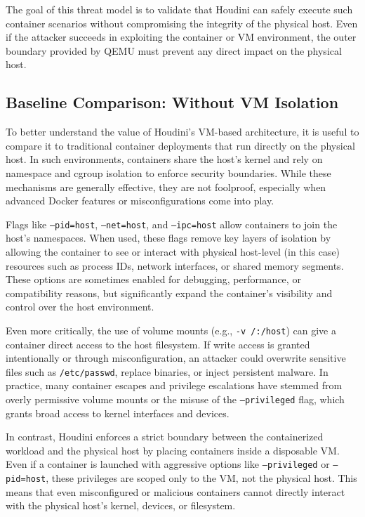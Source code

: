 \documentclass[12pt]{report}
\begin{document}
\begin{doublespace}
The goal of this threat model is to validate that Houdini can safely execute such container scenarios without compromising the integrity of the physical host. Even if the attacker succeeds in exploiting the container or VM environment, the outer boundary provided by QEMU must prevent any direct impact on the physical host.

\subsection{Baseline Comparison: Without VM Isolation}

To better understand the value of Houdini’s VM-based architecture, it is useful to compare it to traditional container deployments that run directly on the physical host. In such environments, containers share the host's kernel and rely on namespace and cgroup isolation to enforce security boundaries. While these mechanisms are generally effective, they are not foolproof, especially when advanced Docker features or misconfigurations come into play.

Flags like \texttt{--pid=host}, \texttt{--net=host}, and \texttt{--ipc=host} allow containers to join the host’s namespaces. When used, these flags remove key layers of isolation by allowing the container to see or interact with physical host-level (in this case) resources such as process IDs, network interfaces, or shared memory segments. These options are sometimes enabled for debugging, performance, or compatibility reasons, but significantly expand the container’s visibility and control over the host environment.

Even more critically, the use of volume mounts (e.g., \texttt{-v /:/host}) can give a container direct access to the host filesystem. If write access is granted intentionally or through misconfiguration, an attacker could overwrite sensitive files such as \texttt{/etc/passwd}, replace binaries, or inject persistent malware. In practice, many container escapes and privilege escalations have stemmed from overly permissive volume mounts or the misuse of the \texttt{--privileged} flag, which grants broad access to kernel interfaces and devices.

In contrast, Houdini enforces a strict boundary between the containerized workload and the physical host by placing containers inside a disposable VM. Even if a container is launched with aggressive options like \texttt{--privileged} or \texttt{--pid=host}, these privileges are scoped only to the VM, not the physical host. This means that even misconfigured or malicious containers cannot directly interact with the physical host's kernel, devices, or filesystem.


\end{doublespace}
\end{document}
